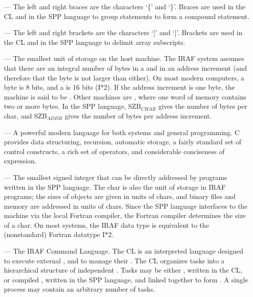 \medskip \noindent {} --- The left and right braces are 
the characters `\{' and `\}'.  Braces are used in the CL and in the 
SPP language to group statements to form a compound statement.

\medskip \noindent {} --- The left and right brackets 
are the characters `[' and `]'. Brackets are used in the CL and in the
SPP language to delimit array subscripts.

\medskip \noindent {} --- The smallest unit of storage on 
the host machine.  The IRAF system assumes that there are an integral 
number of bytes in a  and in an address increment 
(and therefore that the byte is not larger than either).
On most modern computers, a byte is 8 bits, and a  is 16 bits
(I$*$2).  If the address increment is one byte, the machine
is said to be .  Other machines are , where one word of memory contains two or more bytes.
In the SPP language, SZB$_{CHAR}$ gives the number of bytes per char,
and SZB$_{ADDR}$ gives the number of bytes per address increment.

\medskip \noindent {} --- A powerful modern language for 
both systems and general programming.
C provides data structuring, recursion, automatic storage, a fairly
standard set of control constructs, a rich set of operators,
and considerable conciseness of expression.

\medskip \noindent {} --- The smallest signed integer that can be
directly addressed by programs written in the SPP language.  The char
is also the unit of storage in IRAF programs; the sizes of objects are
given in units of chars, and binary files and memory are addressed in
units of chars.  Since the SPP language interfaces to the machine via the
local Fortran compiler, the Fortran compiler determines the size of a char.
On most systems, the IRAF data type  is equivalent to the
(nonstandard) Fortran datatype I$*$2.

\medskip \noindent {} --- The IRAF Command Language.  The CL is an
interpreted language designed to execute external , and
to manage their .
The CL organizes tasks into a hierarchical structure of independent
.  Tasks may be either , written in
the CL, or compiled , written in the SPP language, and
linked together to form .  A single process may contain
an arbitrary number of tasks.

